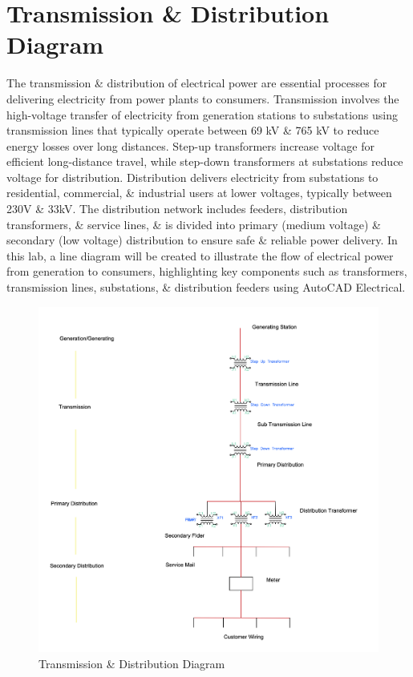 \documentclass[12pt]{article}
\begin{document}
\section*{Transmission \& Distribution Diagram}
The transmission \& distribution of electrical power are essential processes for delivering electricity from power plants to consumers. Transmission involves the high-voltage transfer of electricity from generation stations to substations using transmission lines that typically operate between 69 kV \& 765 kV to reduce energy losses over long distances. Step-up transformers increase voltage for efficient long-distance travel, while step-down transformers at substations reduce voltage for distribution. Distribution delivers electricity from substations to residential, commercial, \& industrial users at lower voltages, typically between 230V \& 33kV. The distribution network includes feeders, distribution transformers, \& service lines, \& is divided into primary (medium voltage) \& secondary (low voltage) distribution to ensure safe \& reliable power delivery. In this lab, a line diagram will be created to illustrate the flow of electrical power from generation to consumers, highlighting key components such as transformers, transmission lines, substations, \& distribution feeders using AutoCAD Electrical.

\begin{figure}[H]
    \centering
    \includegraphics[width=\textwidth]{1.png}
    \caption{Transmission \& Distribution Diagram}
    \label{fig:transmission_distribution}
\end{figure}
\end{document}
